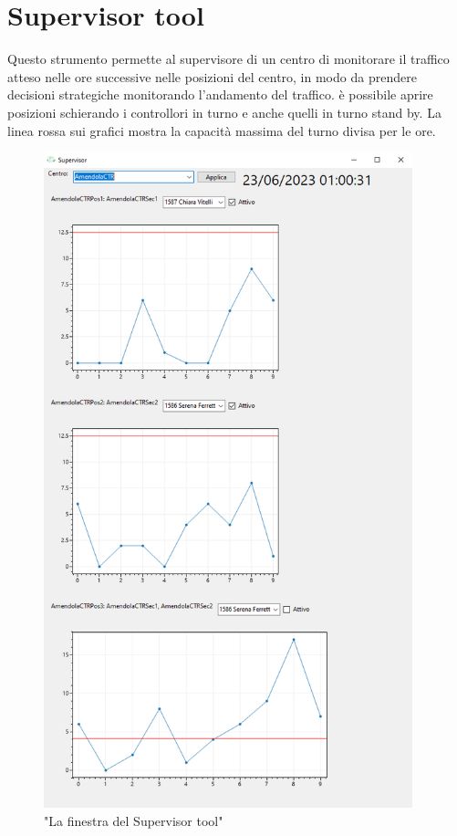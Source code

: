 \section{Supervisor tool}
Questo strumento permette al supervisore di un centro di monitorare il traffico atteso nelle ore successive nelle posizioni del centro, in modo da prendere decisioni strategiche monitorando l'andamento del traffico.
è possibile aprire posizioni schierando i controllori in turno e anche quelli in turno stand by. La linea rossa sui grafici mostra la capacità massima del turno divisa per le ore.
\begin{figure}[H]
     \centering
     \includegraphics[height=19cm]{figures/sup.PNG}
     \caption{"La finestra del Supervisor tool"}
   \end{figure}